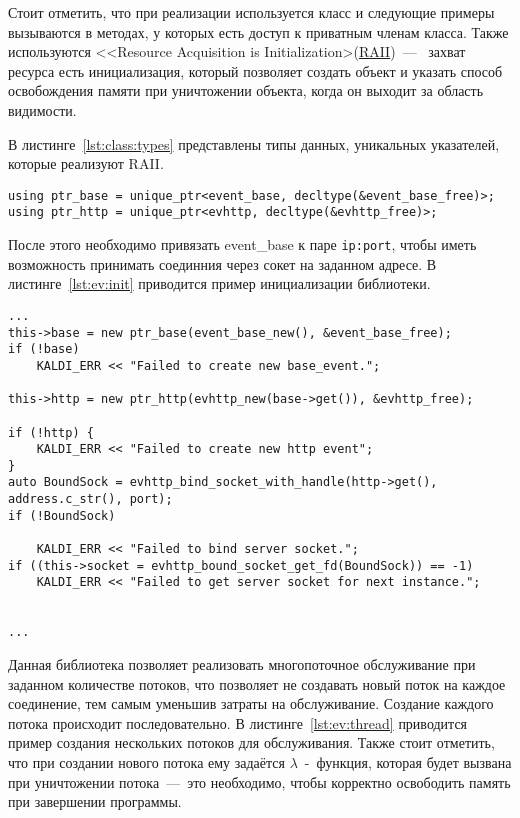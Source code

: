 Стоит отметить, что при реализации используется класс и следующие примеры вызываются
в методах, у которых есть доступ к приватным членам класса. Также используются
<<Resource Acquisition is Initialization>(\hyperlink{raii}{RAII})~---~
захват ресурса есть инициализация, который позволяет создать объект и указать
способ освобождения памяти при уничтожении объекта, когда он выходит за область
видимости.

В листинге~\ref{lst:class:types} представлены типы данных, уникальных указателей,
которые реализуют RAII.
\begin{lstlisting}[caption={Описание некоторых типов данных}, label={lst:class:types}]
using ptr_base = unique_ptr<event_base, decltype(&event_base_free)>;
using ptr_http = unique_ptr<evhttp, decltype(&evhttp_free)>;
\end{lstlisting}

После этого необходимо привязать event\_base к паре \texttt{ip:port}, чтобы иметь
возможность принимать соединния через сокет на заданном адресе. В листинге~\ref{lst:ev:init}
приводится пример инициализации библиотеки.

\begin{lstlisting}[caption={Пример инициализации библиотеки \textit{libevent}}, label={lst:ev:init}]
...
this->base = new ptr_base(event_base_new(), &event_base_free);
if (!base)
    KALDI_ERR << "Failed to create new base_event.";

this->http = new ptr_http(evhttp_new(base->get()), &evhttp_free);

if (!http) {
    KALDI_ERR << "Failed to create new http event";
}
auto BoundSock = evhttp_bind_socket_with_handle(http->get(), address.c_str(), port);
if (!BoundSock)

    KALDI_ERR << "Failed to bind server socket.";
if ((this->socket = evhttp_bound_socket_get_fd(BoundSock)) == -1)
    KALDI_ERR << "Failed to get server socket for next instance.";


...
\end{lstlisting}

Данная библиотека позволяет реализовать многопоточное обслуживание при заданном
количестве потоков, что позволяет не создавать новый поток на каждое соединение,
тем самым уменьшив затраты на обслуживание. Создание каждого потока происходит
последовательно. В листинге~\ref{lst:ev:thread} приводится пример создания
нескольких потоков для обслуживания. Также стоит отметить, что при создании
нового потока ему задаётся $\lambda$~-~функция, которая будет вызвана при уничтожении
потока~---~это необходимо, чтобы корректно освободить память при завершении программы.

